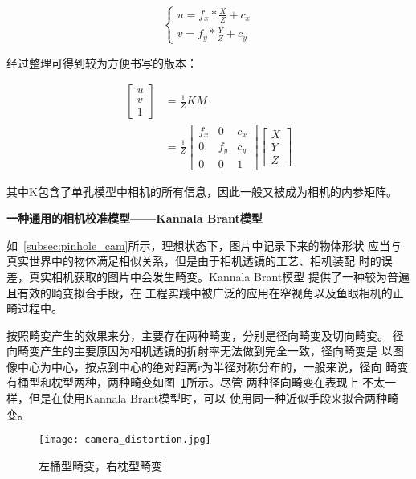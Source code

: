 \begin{equation}
  \begin{cases}
    u = f_x * \frac{X}{Z} + c_x \\
    v = f_y * \frac{Y}{Z} + c_y
  \end{cases}
\end{equation}


经过整理可得到较为方便书写的版本：

\begin{equation}
  \begin{aligned}
    \begin{bmatrix}
      u \\
      v \\
      1
    \end{bmatrix}
    &= \frac{1}{Z} K M \\
    &= \frac{1}{Z}
    \begin{bmatrix}
      f_x & 0   & c_x \\
        0 & f_y & c_y \\
        0 & 0   &   1
    \end{bmatrix}
    \begin{bmatrix}
      X \\
      Y \\
      Z
    \end{bmatrix}
  \end{aligned}
\end{equation}

其中K包含了单孔模型中相机的所有信息，因此一般又被成为相机的内参矩阵。

\noindent \textbf{一种通用的相机校准模型——Kannala Brant模型}

如~\ref{subsec:pinhole_cam}所示，理想状态下，图片中记录下来的物体形状
应当与真实世界中的物体满足相似关系，但是由于相机透镜的工艺、相机装配
时的误差，真实相机获取的图片中会发生畸变。Kannala Brant模型
\cite{kannala2006generic} 提供了一种较为普遍且有效的畸变拟合手段，在
工程实践中被广泛的应用在窄视角以及鱼眼相机的正畸过程中。

按照畸变产生的效果来分，主要存在两种畸变，分别是径向畸变及切向畸变。
径向畸变产生的主要原因为相机透镜的折射率无法做到完全一致，径向畸变是
以图像中心为中心，按点到中心的绝对距离r为半径对称分布的，一般来说，径向
畸变有桶型和枕型两种，两种畸变如图~\ref{fig:radial_distort}所示。尽管
两种径向畸变在表现上 不太一样，但是在使用Kannala Brant模型时，可以
使用同一种近似手段来拟合两种畸变。

\begin{figure}[h] %
  \centering
  \texttt{[image: camera\_distortion.jpg]}
  \caption{左桶型畸变，右枕型畸变}
  \label{fig:radial_distort}
\end{figure}

